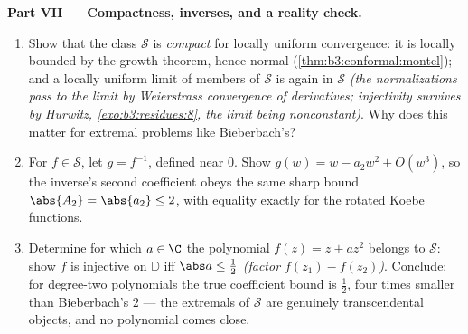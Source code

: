 \begin{problem}
\begin{enumerate}[resume]
\end{enumerate}
\medskip
\noindent\textbf{Part VII --- Compactness, inverses, and a
reality check.}
\begin{enumerate}[resume]
  \item Show that the class $\mathcal S$ is \emph{compact}
        for locally uniform convergence: it is locally
        bounded by the growth theorem, hence normal
        (\cref{thm:b3:conformal:montel}); and a locally
        uniform limit of members of $\mathcal S$ is again in
        $\mathcal S$ \emph{(the normalizations pass to the
        limit by Weierstrass convergence of derivatives;
        injectivity survives by Hurwitz,
        \cref{exo:b3:residues:8}, the limit being
        nonconstant)}. Why does this matter for extremal
        problems like Bieberbach's?
  \item For $f \in \mathcal S$, let $g = f^{-1}$, defined
        near $0$. Show $g(w) = w - a_2w^2 + O(w^3)$, so the
        inverse's second coefficient obeys the same sharp
        bound $\abs{A_2} = \abs{a_2} \leq 2$, with equality
        exactly for the rotated Koebe functions.
  \item Determine for which $a \in \C$ the polynomial $f(z)
        = z + az^2$ belongs to $\mathcal S$: show $f$ is
        injective on $\mathbb D$ iff $\abs a \leq \frac12$
        \emph{(factor $f(z_1) - f(z_2)$)}. Conclude: for
        degree-two polynomials the true coefficient bound is
        $\frac12$, four times smaller than Bieberbach's $2$
        --- the extremals of $\mathcal S$ are genuinely
        transcendental objects, and no polynomial comes
        close.
\end{enumerate}
\end{problem}
